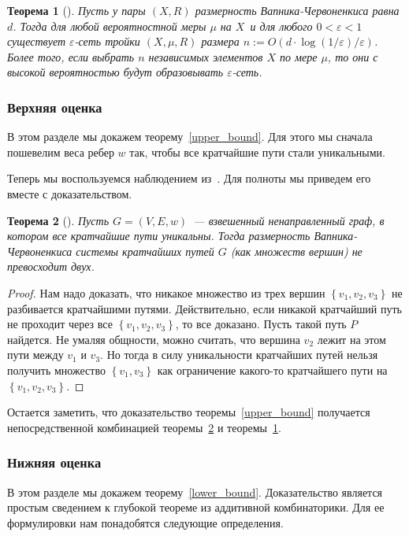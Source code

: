 \documentclass[12pt]{article}
\newcommand{\eps}{\varepsilon}
\newcommand{\set}[1]{\left\{#1\right\}}
\newtheorem{theorem}{Теорема}
\begin{document}
    \begin{theorem}[\cite{HW86}]
        \label{full_epsilon_net}
        Пусть у пары $(X, R)$ размерность Вапника-Червоненкиса равна $d$. Тогда для любой вероятностной меры $\mu$ на $X$\
        и для любого $0 < \varepsilon < 1$ существует $\varepsilon$-сеть тройки $(X, \mu, R)$ размера
        $n := O(d \cdot \log(1 / \varepsilon) / \varepsilon)$.
        Более того, если выбрать $n$ независимых элементов $X$ по мере $\mu$, то они с высокой вероятностью будут
        образовывать $\eps$-сеть.
    \end{theorem}
    \subsubsection{Верхняя оценка}
    \label{subsubsection_upper_bound}
    В этом разделе мы докажем теорему~\ref{upper_bound}.
    Для этого мы сначала пошевелим веса ребер $w$ так, чтобы все кратчайшие пути стали уникальными.

    Теперь мы воспользуемся наблюдением из~\cite{ADFGW11}. Для полноты мы приведем его вместе с доказательством.
    \begin{theorem}[\cite{ADFGW11}]
        \label{unique_vc_dimension}
        Пусть $G = (V, E, w)$~--- взвешенный ненаправленный граф, в котором все кратчайшие пути уникальны.
        Тогда размерность Вапника-Червоненкиса системы кратчайших путей $G$ (как множеств вершин)
        не превосходит двух.
    \end{theorem}
    \begin{proof}
        Нам надо доказать, что никакое множество из трех вершин $\set{v_1, v_2, v_3}$ не разбивается кратчайшими путями.
        Действительно, если никакой кратчайший путь не проходит через все $\set{v_1, v_2, v_3}$, то все доказано.
        Пусть такой путь $P$ найдется. Не умаляя общности, можно считать, что вершина $v_2$ лежит на этом пути между
        $v_1$ и $v_3$. Но тогда в силу уникальности кратчайших путей нельзя получить множество $\set{v_1, v_3}$
        как ограничение какого-то кратчайшего пути на $\set{v_1, v_2, v_3}$.
    \end{proof}

    Остается заметить, что доказательство теоремы~\ref{upper_bound} получается непосредственной комбинацией
    теоремы~\ref{unique_vc_dimension} и теоремы~\ref{full_epsilon_net}.
    \subsubsection{Нижняя оценка}
    \label{subsubsection_lower_bound}
    В этом разделе мы докажем теорему~\ref{lower_bound}.
    Доказательство является простым сведением к глубокой теореме из аддитивной комбинаторики. Для ее формулировки нам
    понадобятся следующие определения.
\end{document}
